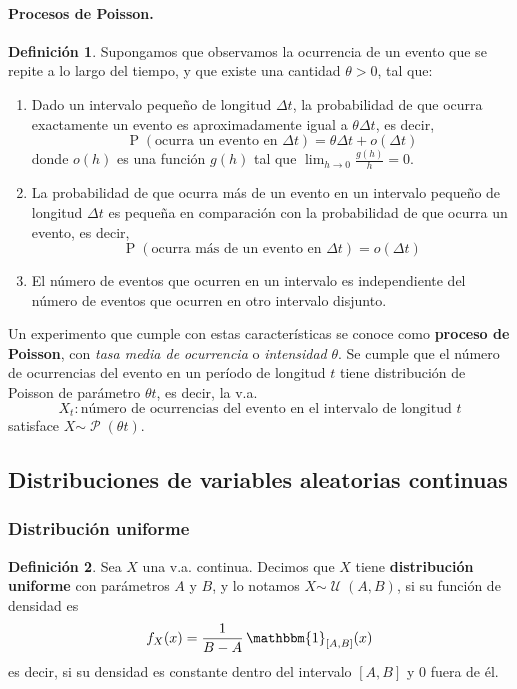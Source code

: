 \documentclass[11pt]{article}
\theoremstyle{plain}
\theoremstyle{definition}
\newtheorem*{defi}{Definición}
\theoremstyle{remark}
\newcommand{\deft}[1]{\textbf{#1}}  %
\newcommand{\proba}{\ensuremath{\operatorname{P}}}  %
\newcommand{\indi}[1]{\ensuremath{\mathbbm{1}_{#1}}}  %
\newcommand{\dist}[1]{\ensuremath{\sim \operatorname{#1}}}  %
\newcommand{\poisson}[0]{\ensuremath{\mathcal{P}}}  %
\newcommand{\unif}[0]{\ensuremath{\mathcal{U}}}  %
\begin{document}
      \paragraph{Procesos de Poisson.}
      \begin{defi}
        Supongamos que observamos la ocurrencia de un evento que se repite a lo largo del tiempo, y que existe una cantidad $\theta > 0$, tal que:
        \begin{enumerate}
          \item Dado un intervalo pequeño de longitud $\Delta t$, la probabilidad de que ocurra exactamente un evento es aproximadamente igual a $\theta \Delta t$, es decir,
          \[ \proba(\text{ocurra un evento en }\Delta t) = \theta \Delta t + o(\Delta t) \]
          donde $o(h)$ es una función $g(h)$ tal que $\lim_{h \to 0} \frac{g(h)}{h} = 0$.
          \item La probabilidad de que ocurra más de un evento en un intervalo pequeño de longitud $\Delta t$ es pequeña en comparación con la probabilidad de que ocurra un evento, es decir,
          \[ \proba(\text{ocurra más de un evento en }\Delta t) = o(\Delta t) \]
          \item El número de eventos que ocurren en un intervalo es independiente del número de eventos que ocurren en otro intervalo disjunto.
        \end{enumerate}
        Un experimento que cumple con estas características se conoce como \deft{proceso de Poisson}, con \emph{tasa media de ocurrencia} o \emph{intensidad} $\theta$. Se cumple que el número de ocurrencias del evento en un período de longitud $t$ tiene distribución de Poisson de parámetro $\theta t$, es decir, la v.a.
        \[ X_t : \text{número de ocurrencias del evento en el intervalo de longitud $t$} \]
        satisface $X \dist{\poisson}(\theta t)$.
      \end{defi}

  \subsection{Distribuciones de variables aleatorias continuas}

    \subsubsection{Distribución uniforme}

      \begin{defi}
        Sea $X$ una v.a. continua. Decimos que $X$ tiene \deft{distribución uniforme} con parámetros $A$ y $B$, y lo notamos $X \dist{\unif}(A,B)$, si su función de densidad es
        \[ f_X(x) = \frac{1}{B - A} \, \indi{[A,B]}(x) \]
        es decir, si su densidad es constante dentro del intervalo $[A,B]$ y $0$ fuera de él.
      \end{defi}
\end{document}
